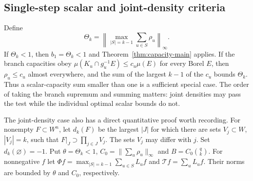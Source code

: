 \documentclass[11pt,reqno]{amsart}
\numberwithin{equation}{section}
\theoremstyle{definition}
\begin{document}
\subsection{Single-step scalar and joint-density criteria}
Define
\begin{equation}\label{eq:cap-Theta}
 \Theta_k=\left\|\max_{|S|=k-1}\sum_{u\in S}\rho_u\right\|_\infty.
\end{equation}
If $\Theta_k<1$, then $b_1=\Theta_k<1$ and
Theorem~\ref{thm:capacity-main} applies. If the branch capacities obey
$\mu(K_u\cap g_u^{-1}E)\le c_u\mu(E)$ for every Borel $E$,
then $\rho_u\le c_u$ almost everywhere, and the sum of the largest
$k-1$ of the $c_u$ bounds $\Theta_k$. Thus a scalar-capacity sum
smaller than one is a sufficient special case. The order of taking
the branch supremum and summing matters: joint densities may pass
the test while the individual optimal scalar bounds do not.

The joint-density case also has a direct quantitative proof worth
recording. For nonempty $F\subset W^n$, let $d_k(F)$ be the largest
$|J|$ for which there are sets $V_j\subset W$, $|V_j|=k$, such that
$F|_J\supset\prod_{j\in J}V_j$. The sets $V_j$ may differ with $j$.
Set $d_k(\varnothing)=-1$. Put $\theta=\Theta_k<1$, $C_0=\|\sum_u\rho_u\|_\infty$ and
$B=C_0\binom qk$. For nonnegative $f$ let
$\Phi f=\max_{|S|=k-1}\sum_{u\in S}L_uf$ and
$\mathcal Tf=\sum_uL_uf$. Their norms are bounded by $\theta$
and $C_0$, respectively.
\end{document}
